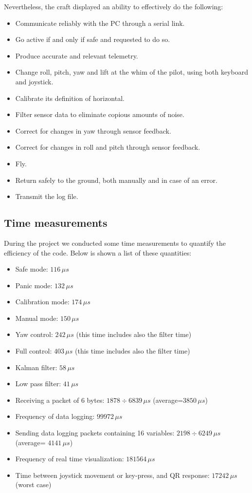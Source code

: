 \documentclass[11pt]{article}
\begin{document}
Nevertheless, the craft displayed an ability to effectively do the following:
\begin{itemize}
	\item{Communicate reliably with the PC through a serial link.}
	\item{Go active if and only if safe and requested to do so.}
	\item{Produce accurate and relevant telemetry.}
	\item{Change roll, pitch, yaw and lift at the whim of the pilot, using both keyboard and joystick.}
	\item{Calibrate its definition of horizontal.}
	\item{Filter sensor data to eliminate copious amounts of noise.}
	\item{Correct for changes in yaw through sensor feedback.}
	\item{Correct for changes in roll and pitch through sensor feedback.}
	\item{Fly.}
	\item{Return safely to the ground, both manually and in case of an error.}
	\item{Transmit the log file.}
\end{itemize}

\subsection{Time measurements}

During the project we conducted some time measurements to quantify
the efficiency of the code. Below is shown a list of these quantities:
\begin{itemize}
\item Safe mode: $116\,\mu s$
\item Panic mode: $132\,\mu s$
\item Calibration mode: $174\,\mu s$
\item Manual mode: $150\,\mu s$
\item Yaw control: $242\,\mu s$ (this time includes also the filter time)
\item Full control: $403\,\mu s$ (this time includes also the filter time)
\item Kalman filter: $58\,\mu s$ 
\item Low pass filter: $41\,\mu s$
\item Receiving a packet of 6 bytes: $1878\div6839\,\mu s$ (average=$3850\,\mu s$)
\item Frequency of data logging: $99972\,\mu s$
\item Sending data logging packets containing 16 variables: $2198\div6249\,\mu s$
(average= $4141\,\mu s$)
\item Frequency of real time visualization: $181564\,\mu s$
\item Time between joystick movement or key-press, and QR response: $17242\,\mu s$
(worst case)
\end{itemize}
\end{document}
